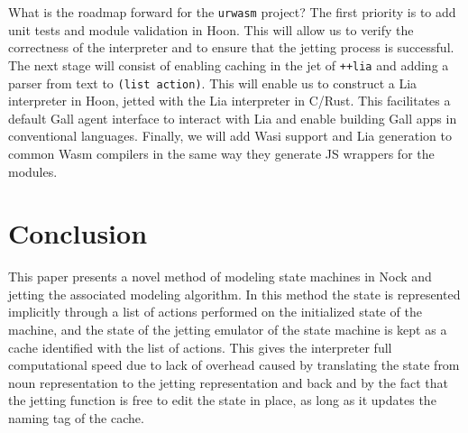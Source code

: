 \documentclass[twoside]{article}
\begin{document}
What is the roadmap forward for the \texttt{urwasm} project?  The first priority is to add unit tests and module validation in Hoon.  This will allow us to verify the correctness of the interpreter and to ensure that the jetting process is successful.  The next stage will consist of enabling caching in the jet of \lstinline[style=inlinecode]{++lia} and adding a parser from text to \lstinline[style=inlinecode]{(list action)}.  This will enable us to construct a Lia interpreter in Hoon, jetted with the Lia interpreter in C/Rust.  This facilitates a default Gall agent interface to interact with Lia and enable building Gall apps in conventional languages.  Finally, we will add Wasi support and Lia generation to common Wasm compilers in the same way they generate JS wrappers for the modules.


\section{Conclusion}

This paper presents a novel method of modeling state machines in Nock and jetting the associated modeling algorithm. In this method the state is represented implicitly through a list of actions performed on the initialized state of the machine, and the state of the jetting emulator of the state machine is kept as a cache identified with the list of actions. This gives the interpreter full computational speed due to lack of overhead caused by translating the state from noun representation to the jetting representation and back and by the fact that the jetting function is free to edit the state in place, as long as it updates the naming tag of the cache.  \tombstone{}

\printbibliography
\end{document}
